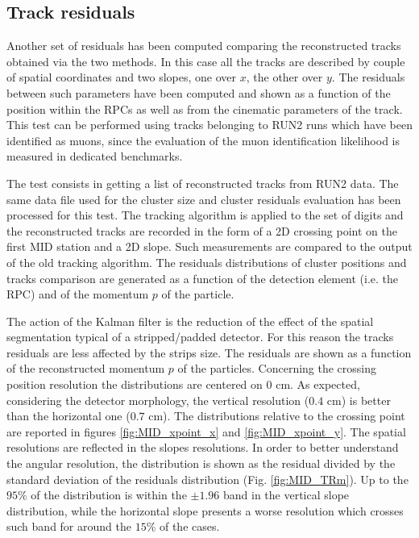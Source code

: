 \subsection{Track residuals}
Another set of residuals has been computed comparing the reconstructed tracks obtained via the two methods.
In this case all the tracks are described by couple of spatial coordinates and two slopes, one over $x$, the other over $y$.
The residuals between such parameters have been computed and shown as a function of the position within the RPCs as well as from the cinematic parameters of the track.
This test can be performed using tracks belonging to RUN2 runs which have been identified as muons, since the evaluation of the muon identification likelihood is measured in dedicated benchmarks.

The test consists in getting a list of reconstructed tracks from RUN2 data.
The same data file used for the cluster size and cluster residuals evaluation has been processed for this test.
The tracking algorithm is applied to the set of digits and the reconstructed tracks are recorded in the form of a 2D crossing point on the first MID station and a 2D slope.
Such measurements are compared to the output of the old tracking algorithm.
The residuals distributions of cluster positions and tracks comparison are generated as a function of the detection element (i.e. the RPC) and of the momentum $p$ of the particle.

The action of the Kalman filter is the reduction of the effect of the spatial segmentation typical of a stripped/padded detector.
For this reason the tracks residuals are less affected by the strips size.
The residuals are shown as a function of the reconstructed momentum $p$ of the particles.
Concerning the crossing position resolution the distributions are centered on $0$ cm.
As expected, considering the detector morphology, the vertical resolution ($0.4$ cm) is better than the horizontal one ($0.7$ cm).
The distributions relative to the crossing point are reported in figures \ref{fig:MID_xpoint_x} and \ref{fig:MID_xpoint_y}.
The spatial resolutions are reflected in the slopes resolutions.
In order to better understand the angular resolution, the distribution is shown as the residual divided by the standard deviation of the residuals distribution (Fig. \ref{fig:MID_TRm}).
Up to the $95\%$ of the distribution is within the $\pm1.96$ band in the vertical slope distribution, while the horizontal slope presents a worse resolution which crosses such band for around the $15\%$ of the cases.


